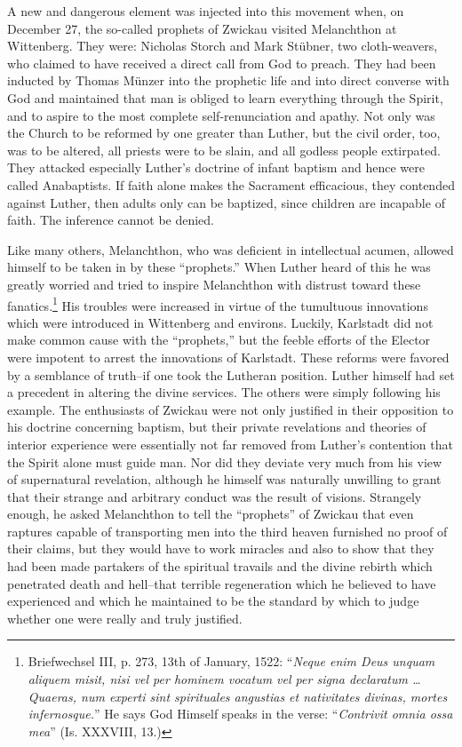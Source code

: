 A new and dangerous element was injected into this movement
when, on December 27, the so-called prophets of Zwickau visited
Melanchthon at Wittenberg. They were: Nicholas Storch and Mark
Stübner, two cloth-weavers, who claimed to have received a direct
call from God to preach. They had been inducted by Thomas Münzer into
the prophetic life and into direct converse with God and
maintained that man is obliged to learn everything through the Spirit,
and to aspire to the most complete self-renunciation and apathy. Not
only was the Church to be reformed by one greater than Luther, but
the civil order, too, was to be altered, all priests were to be slain, and
all godless people extirpated. They attacked especially Luther’s doctrine
of infant baptism and hence were called Anabaptists. If faith
alone makes the Sacrament efficacious, they contended against Luther,
then adults only can be baptized, since children are incapable of faith.
The inference cannot be denied.

Like many others, Melanchthon, who was deficient in intellectual
acumen, allowed himself to be taken in by these “prophets.” When
Luther heard of this he was greatly worried and tried to inspire
Melanchthon with distrust toward these fanatics.\footnote
{Briefwechsel III, p. 273, 13th of January, 1522: “\textit{Neque enim Deus unquam aliquem
misit, nisi vel per hominem vocatum vel per signa declaratum \dots Quaeras, num experti
sint spirituales angustias et nativitates divinas, mortes infernosque.}” He says God Himself
speaks in the verse: “\textit{Contrivit omnia ossa mea}” (Is. XXXVIII, 13.)}
His troubles were
increased in virtue of the tumultuous innovations which were introduced
in Wittenberg and environs. Luckily, Karlstadt did not make
common cause with the “prophets,” but the feeble efforts of the
Elector were impotent to arrest the innovations of Karlstadt.
These reforms were favored by a semblance of truth--if one
took the Lutheran position. Luther himself had set a precedent in
altering the divine services. The others were simply following his example.
The enthusiasts of Zwickau were not only justified in their
opposition to his doctrine concerning baptism, but their private revelations
and theories of interior experience were essentially not far
removed from Luther’s contention that the Spirit alone must
guide man. Nor did they deviate very much from his view of supernatural
revelation, although he himself was naturally unwilling to
grant that their strange and arbitrary conduct was the result of
visions. Strangely enough, he asked Melanchthon to tell the “prophets”
of Zwickau that even raptures capable of transporting men
into the third heaven furnished no proof of their claims, but they
would have to work miracles and also to show that they had been
made partakers of the spiritual travails and the divine rebirth which
penetrated death and hell--that terrible regeneration which he believed
to have experienced and which he maintained to be the standard by which
to judge whether one were really and truly justified.

